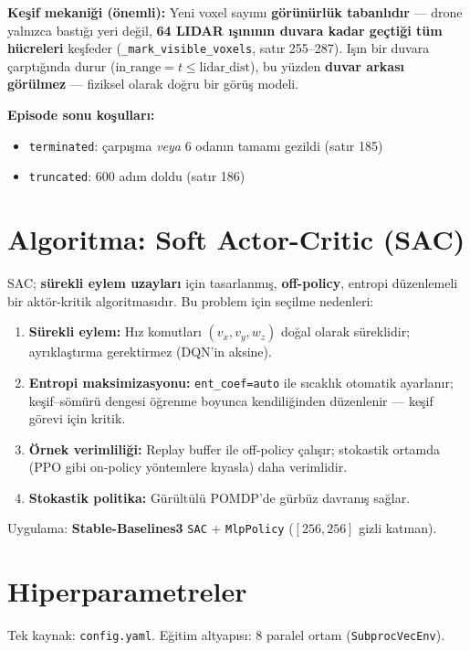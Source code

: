 \documentclass[11pt,a4paper]{article}
\begin{document}
\noindent\textbf{Keşif mekaniği (önemli):} Yeni voxel sayımı \textbf{görünürlük
tabanlıdır} --- drone yalnızca bastığı yeri değil, \textbf{64 LIDAR ışınının
duvara kadar geçtiği tüm hücreleri} keşfeder
(\texttt{\_mark\_visible\_voxels}, satır 255--287). Işın bir duvara çarptığında
durur ($\text{in\_range} = t \le \text{lidar\_dist}$), bu yüzden \textbf{duvar
arkası görülmez} --- fiziksel olarak doğru bir görüş modeli.

\noindent\textbf{Episode sonu koşulları:}
\begin{itemize}[noitemsep]
  \item \texttt{terminated}: çarpışma \emph{veya} 6 odanın tamamı gezildi (satır 185)
  \item \texttt{truncated}: 600 adım doldu (satır 186)
\end{itemize}

\section{Algoritma: Soft Actor-Critic (SAC)}
SAC; \textbf{sürekli eylem uzayları} için tasarlanmış, \textbf{off-policy},
entropi düzenlemeli bir aktör-kritik algoritmasıdır. Bu problem için seçilme
nedenleri:

\begin{enumerate}[noitemsep]
  \item \textbf{Sürekli eylem:} Hız komutları $(v_x, v_y, w_z)$ doğal olarak
  süreklidir; ayrıklaştırma gerektirmez (DQN'in aksine).
  \item \textbf{Entropi maksimizasyonu:} \texttt{ent\_coef=auto} ile sıcaklık
  otomatik ayarlanır; keşif--sömürü dengesi öğrenme boyunca kendiliğinden
  düzenlenir --- keşif görevi için kritik.
  \item \textbf{Örnek verimliliği:} Replay buffer ile off-policy çalışır;
  stokastik ortamda (PPO gibi on-policy yöntemlere kıyasla) daha verimlidir.
  \item \textbf{Stokastik politika:} Gürültülü POMDP'de gürbüz davranış sağlar.
\end{enumerate}

\noindent Uygulama: \textbf{Stable-Baselines3} \texttt{SAC} + \texttt{MlpPolicy}
($[256, 256]$ gizli katman).

\section{Hiperparametreler}\label{sec:hp}
Tek kaynak: \texttt{config.yaml}. Eğitim altyapısı: 8 paralel ortam
(\texttt{SubprocVecEnv}).
\end{document}
